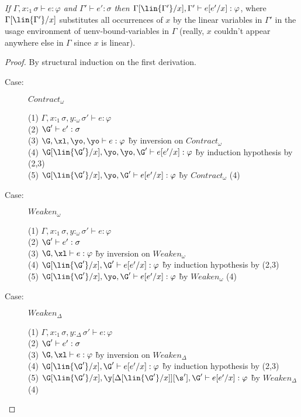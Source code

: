 \begin{lemma}
\emph{If $\Gamma, x{:}_1\sigma \vdash e : \varphi$ and $\Gamma' \vdash e' :
  \sigma$ then $\Gamma[\lin{\Gamma'}/x], \Gamma' \vdash e[e'/x] : \varphi$},
  where $\Gamma[\lin{\Gamma'}/x]$ substitutes all occurrences of $x$ by the
  linear variables in $\Gamma'$ in the usage environment of uenv-bound-variables
  in $\Gamma$ (really, $x$ couldn't appear anywhere else in $\Gamma$ since $x$ is linear).
\end{lemma}

\begin{proof}
By structural induction on the first derivation.

\begin{description}

\item[Case:] $Contract_\omega$
\begin{tabbing}
  (1) $\Gamma, x{:}_1\sigma, y{:}_\omega\sigma' \vdash e : \varphi$\\
  (2) $\G' \vdash e' : \sigma$\\
  (3) $\G, \xl, \yo, \yo \vdash e : \varphi$ \` by inversion on $Contract_\omega$\\
  (4) $\G[\lin{\G'}/x], \yo, \yo, \G' \vdash e[e'/x] : \varphi$ \` by induction hypothesis by (2,3)\\
  (5) $\G[\lin{\G'}/x], \yo, \G' \vdash e[e'/x] : \varphi$ \` by $Contract_\omega$ (4)\\
\end{tabbing}

\item[Case:] $Weaken_\omega$
\begin{tabbing}
  (1) $\Gamma, x{:}_1\sigma, y{:}_\omega\sigma' \vdash e : \varphi$\\
  (2) $\G' \vdash e' : \sigma$\\
  (3) $\G, \xl \vdash e : \varphi$ \` by inversion on $Weaken_\omega$\\
  (4) $\G[\lin{\G'}/x], \G' \vdash e[e'/x] : \varphi$ \` by induction hypothesis by (2,3)\\
  (5) $\G[\lin{\G'}/x], \yo, \G' \vdash e[e'/x] : \varphi$ \` by $Weaken_\omega$ (4)\\
\end{tabbing}

\item[Case:] $Weaken_\Delta$\\
\begin{tabbing}
  (1) $\Gamma, x{:}_1\sigma, y{:}_\Delta\sigma' \vdash e : \varphi$\\
  (2) $\G' \vdash e' : \sigma$\\
  (3) $\G, \xl \vdash e : \varphi$ \` by inversion on $Weaken_\Delta$\\
  (4) $\G[\lin{\G'}/x], \G' \vdash e[e'/x] : \varphi$ \` by induction hypothesis by (2,3)\\
  (5) $\G[\lin{\G'}/x], \y[{\Delta[\lin{\G'}/x]}][\s'], \G' \vdash e[e'/x] : \varphi$ \` by $Weaken_\Delta$ (4)\\
\end{tabbing}


\end{description}
\end{proof}
